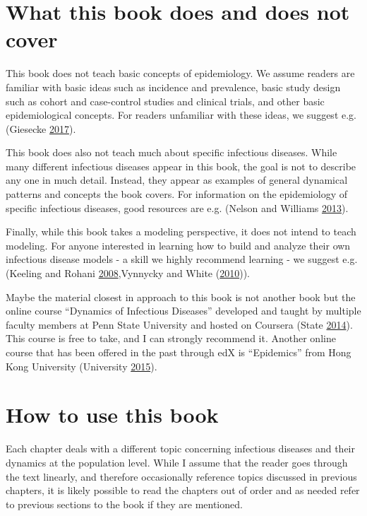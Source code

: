 \documentclass[]{book}
\theoremstyle{definition}
\theoremstyle{definition}
\theoremstyle{definition}
\theoremstyle{remark}
\begin{document}
\section{What this book does and does not
cover}\label{what-this-book-does-and-does-not-cover}

This book does not teach basic concepts of epidemiology. We assume
readers are familiar with basic ideas such as incidence and prevalence,
basic study design such as cohort and case-control studies and clinical
trials, and other basic epidemiological concepts. For readers unfamiliar
with these ideas, we suggest e.g. (Giesecke
\protect\hyperlink{ref-giesecke17}{2017}).

This book does also not teach much about specific infectious diseases.
While many different infectious diseases appear in this book, the goal
is not to describe any one in much detail. Instead, they appear as
examples of general dynamical patterns and concepts the book covers. For
information on the epidemiology of specific infectious diseases, good
resources are e.g. (Nelson and Williams
\protect\hyperlink{ref-nelson13}{2013}).

Finally, while this book takes a modeling perspective, it does not
intend to teach modeling. For anyone interested in learning how to build
and analyze their own infectious disease models - a skill we highly
recommend learning - we suggest e.g. (Keeling and Rohani
\protect\hyperlink{ref-keeling08}{2008},Vynnycky and White
(\protect\hyperlink{ref-vynnycky10}{2010})).

Maybe the material closest in approach to this book is not another book
but the online course ``Dynamics of Infectious Diseases'' developed and
taught by multiple faculty members at Penn State University and hosted
on Coursera (State \protect\hyperlink{ref-epimooc}{2014}). This course
is free to take, and I can strongly recommend it. Another online course
that has been offered in the past through edX is ``Epidemics'' from Hong
Kong University (University \protect\hyperlink{ref-hkepidemics}{2015}).

\section{How to use this book}\label{how-to-use-this-book}

Each chapter deals with a different topic concerning infectious diseases
and their dynamics at the population level. While I assume that the
reader goes through the text linearly, and therefore occasionally
reference topics discussed in previous chapters, it is likely possible
to read the chapters out of order and as needed refer to previous
sections to the book if they are mentioned.
\end{document}
